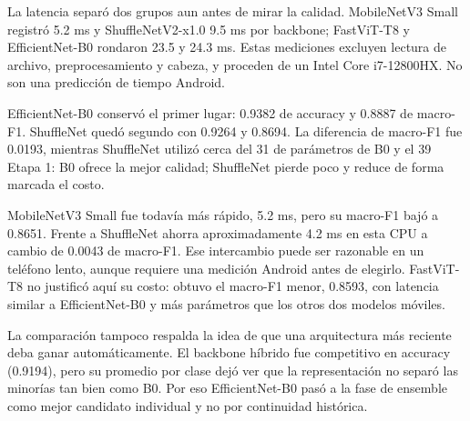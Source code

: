 La latencia separó dos grupos aun antes de mirar la calidad. MobileNetV3 Small
registró 5.2 ms y ShuffleNetV2-x1.0 9.5 ms por backbone; FastViT-T8 y
EfficientNet-B0 rondaron 23.5 y 24.3 ms. Estas mediciones excluyen lectura de
archivo, preprocesamiento y cabeza, y proceden de un Intel Core i7-12800HX. No
son una predicción de tiempo Android.

EfficientNet-B0 conservó el primer lugar: 0.9382 de accuracy y 0.8887 de
macro-F1. ShuffleNet quedó segundo con 0.9264 y 0.8694. La diferencia de
macro-F1 fue 0.0193, mientras ShuffleNet utilizó cerca del 31%
de parámetros de B0 y el 39%
Etapa 1: B0 ofrece la mejor calidad; ShuffleNet pierde poco y reduce de forma
marcada el costo.

MobileNetV3 Small fue todavía más rápido, 5.2 ms, pero su macro-F1 bajó a
0.8651. Frente a ShuffleNet ahorra aproximadamente 4.2 ms en esta CPU a cambio
de 0.0043 de macro-F1. Ese intercambio puede ser razonable en un teléfono
lento, aunque requiere una medición Android antes de elegirlo. FastViT-T8 no
justificó aquí su costo: obtuvo el macro-F1 menor, 0.8593, con latencia similar
a EfficientNet-B0 y más parámetros que los otros dos modelos móviles.

La comparación tampoco respalda la idea de que una arquitectura más reciente
deba ganar automáticamente. El backbone híbrido fue competitivo en accuracy
(0.9194), pero su promedio por clase dejó ver que la representación no separó
las minorías tan bien como B0. Por eso EfficientNet-B0 pasó a la fase de
ensemble como mejor candidato individual y no por continuidad histórica.
